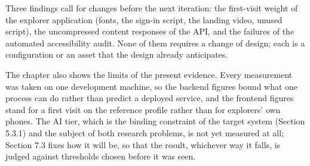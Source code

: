Three findings call for changes before the next iteration: the first-visit weight of the explorer application (fonts, the sign-in script, the landing video, unused script), the uncompressed content responses of the API, and the failures of the automated accessibility audit. None of them requires a change of design; each is a configuration or an asset that the design already anticipates.

The chapter also shows the limits of the present evidence. Every measurement was taken on one development machine, so the backend figures bound what one process can do rather than predict a deployed service, and the frontend figures stand for a first visit on the reference profile rather than for explorers' own phones. The AI tier, which is the binding constraint of the target system (Section 5.3.1) and the subject of both research problems, is not yet measured at all; Section 7.3 fixes how it will be, so that the result, whichever way it falls, is judged against thresholds chosen before it was seen.
